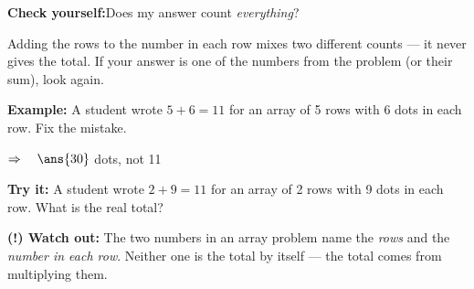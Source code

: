 \documentclass[12pt]{article}
\begin{document}

\begin{formulabox}
\textbf{Check yourself:}\quad Does my answer count \emph{everything}?\par
Adding the rows to the number in each row mixes two different counts --- it never gives the total. If your answer is one of the numbers from the problem (or their sum), look again.
\end{formulabox}

\begin{examplebox}
\textbf{Example:} A student wrote $5 + 6 = 11$ for an array of 5 rows with 6 dots in each row. Fix the mistake.

$\Rightarrow\quad\ans{30}$ dots, not 11
\end{examplebox}

\begin{tryitbox}
\textbf{Try it:} A student wrote $2 + 9 = 11$ for an array of 2 rows with 9 dots in each row. What is the real total?\\[2pt]
\end{tryitbox}

\begin{watchoutbox}
\textbf{(!) Watch out:} The two numbers in an array problem name the \emph{rows} and the \emph{number in each row}. Neither one is the total by itself --- the total comes from multiplying them.
\end{watchoutbox}
\end{document}
